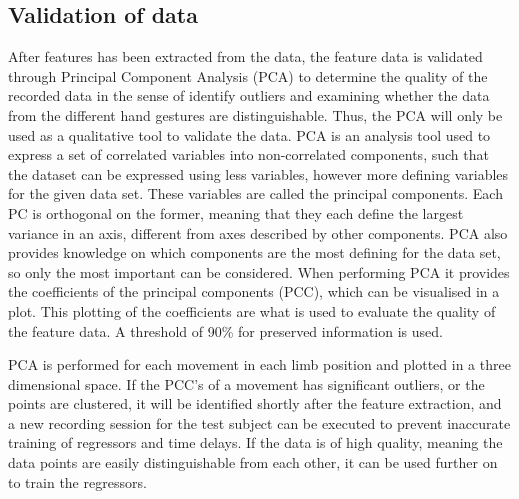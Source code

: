\subsection{Validation of data}


After features has been extracted from the data, the feature data is validated through Principal Component Analysis (PCA) to determine the quality of the recorded data in the sense of identify outliers and examining whether the data from the different hand gestures are distinguishable. Thus, the PCA will only be used as a qualitative tool to validate the data. %
PCA is an analysis tool used to express a set of correlated variables into non-correlated components, such that the dataset can be expressed using less variables, however more defining variables for the given data set. These variables are called the principal components. Each PC is orthogonal on the former, meaning that they each define the largest variance in an axis, different from axes described by other components. PCA also provides knowledge on which components are the most defining for the data set, so only the most important can be considered. When performing PCA it provides the coefficients of the principal components (PCC), which can be visualised in a plot. This plotting of the coefficients are what is used to evaluate the quality of the feature data. A threshold of 90\% for preserved information is used. 

PCA is performed for each movement in each limb position and plotted in a three dimensional space. If the PCC's of a movement has significant outliers, or the points are clustered, it will be identified shortly after the feature extraction, and a new recording session for the test subject can be executed to prevent inaccurate training of regressors and time delays. If the data is of high quality, meaning the data points are easily distinguishable from each other, it can be used further on to train the regressors.

